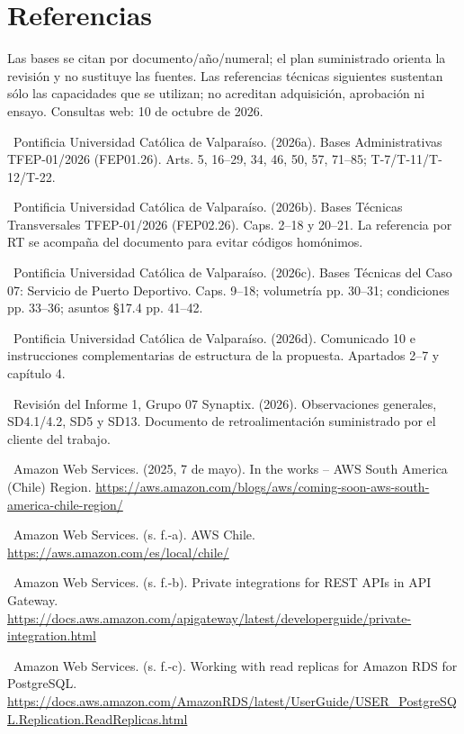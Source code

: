 \documentclass[11pt,letterpaper]{report}
\begin{document}
\section*{Referencias}
Las bases se citan por documento/año/numeral; el plan suministrado orienta la revisión y no sustituye las fuentes. Las referencias técnicas siguientes sustentan sólo las capacidades que se utilizan; no acreditan adquisición, aprobación ni ensayo. Consultas web: 10 de octubre de 2026.

\noindent\textbullet\ Pontificia Universidad Católica de Valparaíso. (2026a). Bases Administrativas TFEP-01/2026 (FEP01.26). Arts. 5, 16--29, 34, 46, 50, 57, 71--85; T-7/T-11/T-12/T-22.\par
\noindent\textbullet\ Pontificia Universidad Católica de Valparaíso. (2026b). Bases Técnicas Transversales TFEP-01/2026 (FEP02.26). Caps. 2--18 y 20--21. La referencia por RT se acompaña del documento para evitar códigos homónimos.\par
\noindent\textbullet\ Pontificia Universidad Católica de Valparaíso. (2026c). Bases Técnicas del Caso 07: Servicio de Puerto Deportivo. Caps. 9--18; volumetría pp. 30--31; condiciones pp. 33--36; asuntos §17.4 pp. 41--42.\par
\noindent\textbullet\ Pontificia Universidad Católica de Valparaíso. (2026d). Comunicado 10 e instrucciones complementarias de estructura de la propuesta. Apartados 2--7 y capítulo 4.\par
\noindent\textbullet\ Revisión del Informe 1, Grupo 07 Synaptix. (2026). Observaciones generales, SD4.1/4.2, SD5 y SD13. Documento de retroalimentación suministrado por el cliente del trabajo.\par
\noindent\textbullet\ Amazon Web Services. (2025, 7 de mayo). In the works -- AWS South America (Chile) Region. \url{https://aws.amazon.com/blogs/aws/coming-soon-aws-south-america-chile-region/}\par
\noindent\textbullet\ Amazon Web Services. (s. f.-a). AWS Chile. \url{https://aws.amazon.com/es/local/chile/}\par
\noindent\textbullet\ Amazon Web Services. (s. f.-b). Private integrations for REST APIs in API Gateway. \url{https://docs.aws.amazon.com/apigateway/latest/developerguide/private-integration.html}\par
\noindent\textbullet\ Amazon Web Services. (s. f.-c). Working with read replicas for Amazon RDS for PostgreSQL. \url{https://docs.aws.amazon.com/AmazonRDS/latest/UserGuide/USER\_PostgreSQL.Replication.ReadReplicas.html}\par
\end{document}
